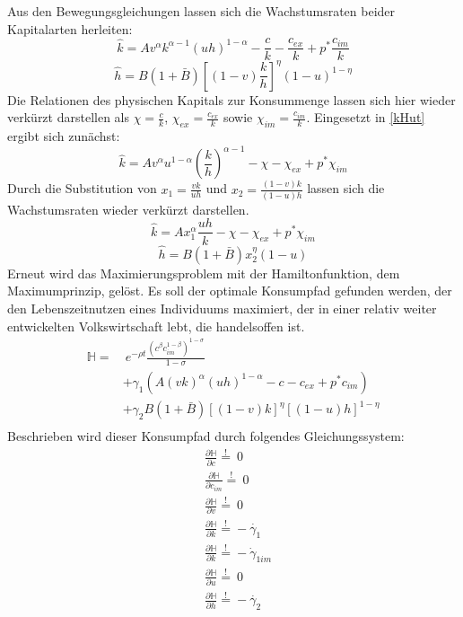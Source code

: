 Aus den Bewegungsgleichungen lassen sich die Wachstumsraten beider Kapitalarten herleiten: 
\begin{equation}
\hat{k}=Av^\alpha k^{\alpha-1}(uh)^{1-\alpha}-\frac{c}{k}-\frac{c_{ex}}{k}+p^*\frac{c_{im}}{k}\label{kHut}
\end{equation}
\begin{equation}
\hat{h}=B(1+\bar{B})\left[(1-v)\frac{k}{h}\right]^{\eta}(1-u)^{1-\eta}
\end{equation}
Die Relationen des physischen Kapitals zur Konsummenge lassen sich hier wieder verkürzt darstellen als $\chi=\frac{c}{k}$, $\chi_{ex}=\frac{c_{ex}}{k}$ sowie $\chi_{im}=\frac{c_{im}}{k}$. Eingesetzt in \eqref{kHut} ergibt sich zunächst:
\begin{equation}
\hat{k}=Av^\alpha u^{1-\alpha}\left(\frac{k}{h}\right)^{\alpha-1}-\chi-\chi_{ex}+p^*\chi_{im}
\end{equation}
Durch die Substitution von $x_1=\frac{vk}{uh}$ und $x_2=\frac{(1-v)k}{(1-u)h}$ lassen sich die Wachstumsraten wieder verkürzt darstellen.\\ 
\begin{equation}
\boxed{\hat{k}=Ax_1^\alpha \frac{uh}{k}-\chi-\chi_{ex}+p^*\chi_{im}}
\end{equation}
\begin{equation}
\boxed{\hat{h}=B(1+\bar{B})x_2^\eta(1-u)}
\end{equation}
Erneut wird das Maximierungsproblem mit der Hamiltonfunktion, dem Maximumprinzip, gelöst. Es soll der optimale Konsumpfad gefunden werden, der den Lebenszeitnutzen eines Individuums maximiert, der in einer relativ weiter entwickelten Volkswirtschaft lebt, die handelsoffen ist.
\begin{equation}
\begin{split}
\mathbb{H}=&~e^{-\rho t}\frac{(c^\beta c_{im}^{1-\beta})^{1-\sigma}}{1-\sigma}\\
&+\gamma_1(A(vk)^\alpha(uh)^{1-\alpha}-c-c_{ex}+p^*c_{im})\\
&+\gamma_2B(1+\bar{B})[(1-v)k]^{\eta}[(1-u)h]^{1-\eta}\\
\end{split}
\end{equation}
Beschrieben wird dieser Konsumpfad durch folgendes Gleichungssystem: 
\begin{align}
&\frac{\partial\mathbb{H}}{\partial c}\overset{!}{=}~0\label{eq:lfoc1IL}\\
&\frac{\partial\mathbb{H}}{\partial c_{im}}\overset{!}{=}~0\label{eq:lfoc1imIL}\\
&\frac{\partial\mathbb{H}}{\partial v}\overset{!}{=}~0\label{eq:lfoc2IL}\\
&\frac{\partial\mathbb{H}}{\partial k}\overset{!}{=}-\dot{\gamma_1}\label{eq:lfoc3IL}\\
&\frac{\partial\mathbb{H}}{\partial k}\overset{!}{=}-\dot{\gamma}_{1im}\label{eq:lfoc3imIL}\\
&\frac{\partial\mathbb{H}}{\partial u}\overset{!}{=}~0\label{eq:lfoc4IL}\\
&\frac{\partial\mathbb{H}}{\partial h}\overset{!}{=}-\dot{\gamma_2}\label{eq:lfoc5IL}
\end{align}
